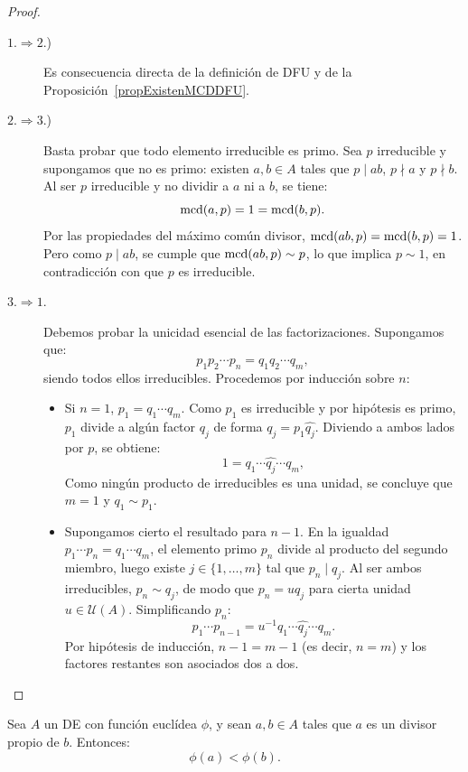 \begin{proof}\
\begin{description}
    \item[$1. \Longrightarrow 2.$)] Es consecuencia directa de la definición de DFU y de la Proposición~\ref{propExistenMCDDFU}.
    
    \item[$2. \Longrightarrow 3.$)] Basta probar que todo elemento irreducible es primo. Sea $p$ irreducible y supongamos que no es primo: existen $a, b \in A$ tales que $p \mid ab$, $p \nmid a$ y $p \nmid b$. Al ser $p$ irreducible y no dividir a $a$ ni a $b$, se tiene:
    \[
        \operatorname{mcd}(a,p) = 1 = \operatorname{mcd}(b,p).
    \]
    Por las propiedades del máximo común divisor, $\operatorname{mcd}(ab, p) = \operatorname{mcd}(b, p) = 1$. Pero como $p \mid ab$, se cumple que $\operatorname{mcd}(ab, p) \sim p$, lo que implica $p \sim 1$, en contradicción con que $p$ es irreducible.

    
    \item[$3. \Longrightarrow 1.$] Debemos probar la unicidad esencial de las factorizaciones. Supongamos que:
    \[
        p_1 p_2 \cdots p_n = q_1 q_2 \cdots q_m,
    \]
    siendo todos ellos irreducibles. Procedemos por inducción sobre $n$:
    \begin{itemize}
        \item Si $n = 1$, $p_1 = q_1 \cdots q_m$. Como $p_1$ es irreducible y por hipótesis es primo, $p_1$ divide a algún factor $q_j$ de forma $q_j=p_1\widehat{q_j}$. Diviendo a ambos lados por $p$, se obtiene:
        \[
            1 = q_1 \cdots \widehat{q_j} \cdots q_m,
        \]
        Como ningún producto de irreducibles es una unidad, se concluye que $m = 1$ y $q_1 \sim p_1$.
        \item Supongamos cierto el resultado para $n - 1$. En la igualdad $p_1 \cdots p_n = q_1 \cdots q_m$, el elemento primo $p_n$ divide al producto del segundo miembro, luego existe $j \in \{1, \dots, m\}$ tal que $p_n \mid q_j$. Al ser ambos irreducibles, $p_n \sim q_j$, de modo que $p_n = u q_j$ para cierta unidad $u \in \mathcal{U}(A)$. Simplificando $p_n$:
        \[
            p_1 \cdots p_{n-1} = u^{-1} q_1 \cdots \widehat{q_j} \cdots q_m.
        \]
        Por hipótesis de inducción, $n - 1 = m - 1$ (es decir, $n = m$) y los factores restantes son asociados dos a dos. \qedhere
    \end{itemize}
\end{description}
\end{proof}

\begin{lema}
    Sea $A$ un DE con función euclídea $\phi$, y sean $a, b \in A$ tales que $a$ es un divisor propio de $b$. Entonces:
    \[
        \phi(a) < \phi(b).
    \]
\end{lema}

